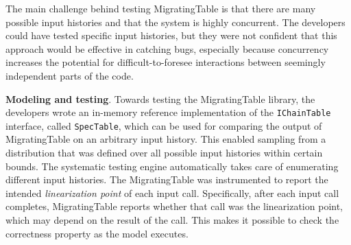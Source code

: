 


The main challenge behind testing MigratingTable is that there are many possible input histories and that the system is highly concurrent. The developers could have tested specific input histories, but they were not confident that this approach would be effective in catching bugs, especially because concurrency increases the potential for difficult-to-foresee interactions between seemingly independent parts of the code.

\textbf{Modeling and testing}.
Towards testing the MigratingTable library, the developers wrote an in-memory reference implementation of the \texttt{IChainTable} interface, called \texttt{SpecTable}, which can be used for comparing the output of MigratingTable on an arbitrary input history. This enabled sampling from a distribution that was defined over all possible input histories within certain bounds. The \psharp systematic testing engine automatically takes care of enumerating different input histories. The MigratingTable was instrumented to report the intended \emph{linearization point} of each input call. Specifically, after each input call completes, MigratingTable reports whether that call was the linearization point, which may depend on the result of the call.  This makes it possible to check the correctness property as the model executes.


